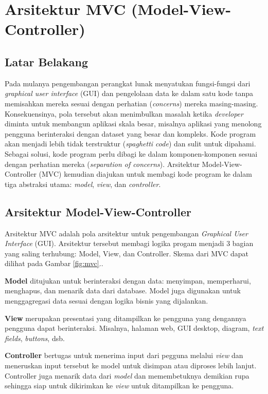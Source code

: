 

\chapter{Arsitektur MVC (Model-View-Controller)}

\section{Latar Belakang}
Pada mulanya pengembangan perangkat lunak menyatukan fungsi-fungsi dari \textit{graphical user interface} (GUI) dan pengelolaan data ke dalam satu kode tanpa memisahkan mereka sesuai dengan perhatian (\textit{concerns}) mereka masing-masing. 
Konsekuensinya, pola tersebut akan menimbulkan masalah ketika \textit{developer} diminta untuk membangun aplikasi  skala besar,  misalnya aplikasi yang menolong pengguna berinteraksi dengan dataset yang besar dan kompleks. Kode program akan menjadi lebih tidak terstruktur (\textit{spaghetti code}) dan sulit untuk dipahami. 
Sebagai solusi, kode program perlu dibagi ke dalam komponen-komponen sesuai dengan perhatian mereka (\textit{separation of concerns}). 
Arsitektur Model-View-Controller (MVC) kemudian diajukan untuk membagi kode program ke dalam tiga abstraksi utama: \textit{model}, \textit{view}, dan \textit{controller}.

\section{Arsitektur Model-View-Controller}
Arsitektur MVC adalah pola arsitektur untuk pengembangan \textit{Graphical User Interface} (GUI). Arsitektur tersebut membagi logika progam menjadi 3 bagian yang saling terhubung: Model, View, dan Controller. Skema dari MVC dapat dilihat pada Gambar \ref{fig:mvc}..

\textbf{Model} ditujukan untuk berinteraksi dengan data: menyimpan, memperharui, menghapus, dan menarik data dari database. Model juga digunakan untuk menggagregasi data sesuai dengan logika bisnis yang dijalankan. 

\textbf{View} merupakan presentasi yang ditampilkan ke pengguna yang dengannya pengguna dapat berinteraksi. Misalnya, halaman web, GUI desktop, diagram, \textit{text fields}, \textit{buttons}, dsb.

\textbf{Controller} bertugas untuk menerima input dari pegguna melalui \textit{view} dan meneruskan input tersebut ke model untuk disimpan atau diproses lebih lanjut. Controller juga menarik data dari \textit{model} dan memembetuknya demikian rupa sehingga siap untuk dikirimkan ke \textit{view} untuk ditampilkan ke pengguna.


